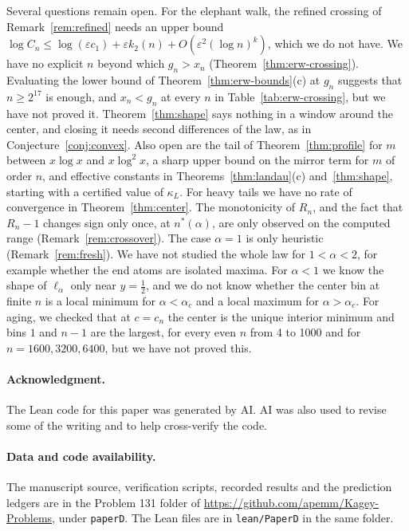 Several questions remain open. For the elephant walk, the refined
crossing of Remark~\ref{rem:refined} needs an upper bound
$\log C_n\le\log(\varepsilon c_1)+\varepsilon k_2(n)
+O(\varepsilon^2(\log n)^k)$, which we do not have. We have no explicit
$n$ beyond which $g_n>x_n$ (Theorem~\ref{thm:erw-crossing}). Evaluating
the lower bound of Theorem~\ref{thm:erw-bounds}(c) at $g_n$ suggests that
$n\ge2^{17}$ is enough, and $x_n<g_n$ at every $n$ in
Table~\ref{tab:erw-crossing}, but we have not proved it.
Theorem~\ref{thm:shape} says nothing in a window around the center, and
closing it needs second differences of the law, as in
Conjecture~\ref{conj:convex}. Also open are the tail of
Theorem~\ref{thm:profile} for $m$ between $x\log x$ and $x\log^2x$, a
sharp upper bound on the mirror term for $m$ of order $n$, and effective
constants in Theorems~\ref{thm:landau}(c) and~\ref{thm:shape}, starting
with a certified value of $\kappa_L$. For heavy tails we have no rate of
convergence in Theorem~\ref{thm:center}. The monotonicity of $R_n$, and
the fact that $R_n-1$ changes sign only once, at $n^*(\alpha)$, are only
observed on the computed range (Remark~\ref{rem:crossover}). The case
$\alpha=1$ is only heuristic (Remark~\ref{rem:fresh}). We have not
studied the whole law for $1<\alpha<2$, for example whether the end atoms
are isolated maxima. For $\alpha<1$ we know the shape of $\ell_\alpha$
only near $y=\frac12$, and we do not know whether the center bin at
finite $n$ is a local minimum for $\alpha<\alpha_c$ and a local maximum
for $\alpha>\alpha_c$. For aging, we checked that at $c=c_n$ the center
is the unique interior minimum and bins $1$ and $n-1$ are the largest,
for every even $n$ from 4 to 1000 and for $n=1600,3200,6400$, but we
have not proved this.

\paragraph{Acknowledgment.}
The Lean code for this paper was generated by AI. AI was also used to
revise some of the writing and to help cross-verify the code.

\paragraph{Data and code availability.}
The manuscript source, verification scripts, recorded results and the
prediction ledgers are in the Problem 131 folder of
\url{https://github.com/apemm/Kagey-Problems}, under \texttt{paperD}. The
Lean files are in \texttt{lean/PaperD} in the same folder.
